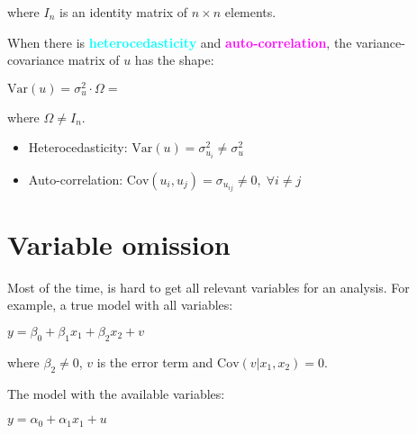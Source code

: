 \documentclass[10pt, a4paper, landscape]{extarticle}
\newcommand{\Var}{\mathrm{Var}}
\newcommand{\Cov}{\mathrm{Cov}}
\begin{document}
\begin{multicols}{3}
\quad where $I_n$ is an identity matrix of $n \times n$ elements.

When there is \textcolor{cyan}{\textbf{heterocedasticity}} and \textcolor{magenta}{\textbf{auto-correlation}}, the variance-covariance matrix of $u$ has the shape:

\begin{center}
	$\Var(u) = \sigma^2_u \cdot \Omega =$
\end{center}

\quad where $\Omega \neq I_n$.

\begin{itemize}[leftmargin=*]
	\item Heterocedasticity: $\Var(u) = \sigma^2_{u_i} \neq \sigma^2_u$
	\item Auto-correlation: $\Cov(u_i, u_j) = \sigma_{u_{ij}} \neq 0, \; \forall i \neq j$
\end{itemize}

\section*{Variable omission}

Most of the time, is hard to get all relevant variables for an analysis. For example, a true model with all variables:

\begin{center}
	$y = \beta_0 + \beta_1 x_1 + \beta_2 x_2 + v$
\end{center}

\quad where $\beta_2 \neq 0$, $v$ is the error term and $\Cov(v|x_1,x_2) = 0$.

The model with the available variables:

\begin{center}
	$y = \alpha_0 + \alpha_1 x_1 + u$
\end{center}


\end{multicols}
\end{document}

